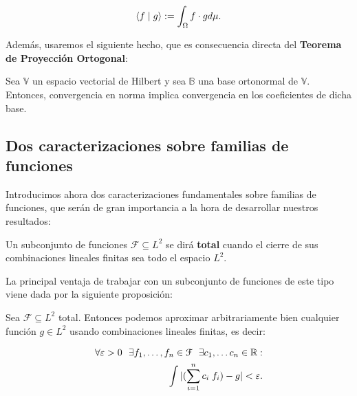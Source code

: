 \begin{equation}
    \langle f \; | \; g \rangle := \int_{\Omega} f \cdot g d\mu.
\end{equation}

Además, usaremos el siguiente hecho, que es consecuencia directa del \textbf{Teorema de Proyección Ortogonal}:

\begin{proposicion} \label{prop:hilbert_convnorma_convcoef}

    Sea $\mathbb{V}$ un espacio vectorial de Hilbert y sea $\mathbb{B}$ una base ortonormal de $\mathbb{V}$. Entonces, convergencia en norma implica convergencia en los coeficientes de dicha base.

\end{proposicion}


\subsection{Dos caracterizaciones sobre familias de funciones} \label{subs:caracterizaciones_familias_funciones}

Introducimos ahora dos caracterizaciones fundamentales sobre familias de funciones, que serán de gran importancia a la hora de desarrollar nuestros resultados:

\begin{definicion}
    Un subconjunto de funciones $\mathcal{F} \subseteq L^2$ se dirá \textbf{total} cuando el cierre de sus combinaciones lineales finitas sea todo el espacio $L^2$.
\end{definicion}

La principal ventaja de trabajar con un subconjunto de funciones de este tipo viene dada por la siguiente proposición:

\begin{proposicion} \label{prop:conjuntos_totales_epsilon_aproximacion}
    Sea $\mathcal{F} \subseteq L^2$ total. Entonces podemos aproximar arbitrariamente bien cualquier función $g \in L^2$ usando combinaciones lineales finitas, es decir:

    \begin{equation} \label{eq:conjuntos_totales_epsilon_aproximacion}
        \begin{split}
            \forall \varepsilon > 0 \ \  \exists f_1, \ldots, f_n \in \mathcal{F} \ \  \exists c_1, \ldots c_n \in \mathbb{R}:\\
            \int | (\sum_{i = 1}^n c_i \; f_i) - g| < \varepsilon . \\
        \end{split}
    \end{equation}

\end{proposicion}

